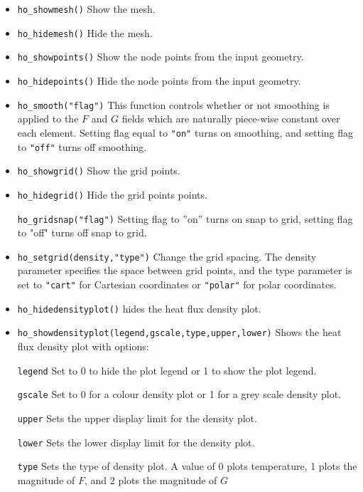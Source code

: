 \begin{itemize}
\item \texttt{ho\_showmesh()} Show the mesh.

\item \texttt{ho\_hidemesh()} Hide the mesh.

\item \texttt{ho\_showpoints()} Show the node points from the input geometry.

\item \texttt{ho\_hidepoints()} Hide the node points from the input geometry.

\item \texttt{ho\_smooth("flag")} This function controls whether or not smoothing is
applied to the $F$ and $G$ fields which are naturally piece-wise
constant over each element. Setting flag equal to \texttt{"on"}
turns on smoothing, and setting flag to \texttt{"off"} turns off
smoothing.

\item \texttt{ho\_showgrid()} Show the grid points.

\item \texttt{ho\_hidegrid()} Hide the grid points points.

\texttt{ho\_gridsnap("flag")} Setting flag to ''on'' turns on snap to grid,
setting flag to "off" turns off snap to grid.

\item \texttt{ho\_setgrid(density,"type")} Change the grid spacing. The density
parameter specifies the space between grid points, and the type
parameter is set to \texttt{"cart"} for Cartesian coordinates or
\texttt{"polar"} for polar coordinates.

\item \texttt{ho\_hidedensityplot()} hides the heat flux density plot.

\item \texttt{ho\_showdensityplot(legend,gscale,type,upper,lower)} Shows the
heat flux density plot with options:

\texttt{legend} Set to 0 to hide the plot legend or 1 to show the plot
legend.

\texttt{gscale} Set to 0 for a colour density plot or 1 for a grey scale
density plot.

\texttt{upper} Sets the upper display limit for the density plot.

\texttt{lower} Sets the lower display limit for the density plot.

\texttt{type} Sets the type of density plot. A value of 0 plots temperature, 1
plots the magnitude of $F$, and 2 plots the magnitude of $G$


\end{itemize}
